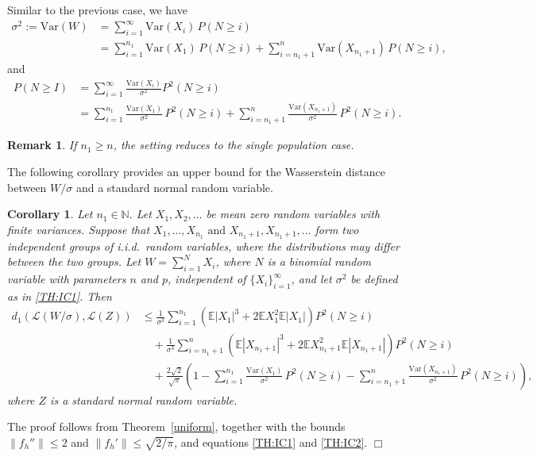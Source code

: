 \documentclass[pdflatex,sn-mathphys-ay]{sn-jnl}
\newcommand{\bbox}{\hfill $\Box$}
\newcommand{\nn}{\nonumber}
\newcommand{\E}{\mathbb{E}}
\newcommand{\Var}{\mathrm{Var}}
\newtheorem{corollary}[theorem]{Corollary}
\newtheorem{remark}[theorem]{Remark}
\theoremstyle{thmstyleone}%
\theoremstyle{thmstyletwo}%
\newtheorem{remark}{Remark}%
\theoremstyle{thmstylethree}%
\begin{document}
        
Similar to the previous case, we have
\begin{align}\label{TH:IC1}
			\sigma^2 := \Var(W) &= \sum_{i=1}^\infty \Var(X_i) \, P(N \ge i)\nn \\
			&=  \sum_{i=1}^{n_{1}  } \Var(X_1)  \, P(N \ge i)+ \sum_{i={n_{1}+1}  }^n \Var(X_{n_{1} + 1})  \, P(N \ge i),
		\end{align}
		and
		\begin{align}\label{TH:IC2}
			{P}(N \ge I) &= \sum_{i=1}^\infty \frac{\Var(X_i)}{\sigma^2}P^2(N \ge i) \nn\\
			&= \sum_{i=1}^{n_1}\frac{\Var(X_1)}{\sigma^2} \, {P}^2(N \ge i) +\sum_{i=n_1+1}^{n}\frac{\Var(X_{n_1+1})}{\sigma^2} \, {P}^2(N \ge i).
		\end{align}
		
	\begin{remark}
If $n_1\ge n$, the setting reduces to the single population case.
	\end{remark}	
		
		The following corollary provides an upper bound for the Wasserstein distance between 
		$W/\sigma$ and a standard normal random variable. 
		
		\begin{corollary}\label{cor:insurance} Let $n_1\in \mathbb{N}.$ Let $X_1,X_2,\ldots$ be mean zero random variables with finite variances.
Suppose that
$X_1,\ldots,X_{n_1} \text{ and }
X_{n_1+1}, X_{n_1+1},\ldots$
form two independent groups of i.i.d.\ random variables, where the distributions may differ
between the two groups. Let $W=\sum_{i=1}^N X_i$, where $N$ is  a binomial random variable  with parameters $n$ and $p$, independent of $\{X_i\}_{i=1}^\infty$, and let $\sigma^2$ be defined as in \eqref{TH:IC1}.  %
   Then
			\begin{align*}
				d_1\left(\mathcal{L}(W/\sigma), \mathcal{L}(Z) \right)
				&\le \frac{1}{\sigma^3}\sum_{i=1}^{n_{1}} \left(\E|X_1|^3 + 2\E X_1^2 \E|X_1|\right) P^2(N \ge i) \\
				&\quad + \frac{1}{\sigma^3} \sum_{i=n_{1}+1}^{n} \left(\E|X_{n_{1}+1}|^3 + 2\E X_{n_{1}+1}^2  \E|X_{n_{1}+1}|\right) P^2(N \ge i) \\
				&\quad + \frac{2\sqrt{2}}{\sqrt{\pi}} \left(1 - \sum_{i=1}^{n_1}\frac{\Var(X_1)}{\sigma^2} \, {P}^2(N \ge i) -\sum_{i=n_1+1}^{n}\frac{\Var(X_{n_1+1})}{\sigma^2} \, {P}^2(N \ge i)\right),
			\end{align*}
			where $Z$ is a standard normal random variable.
		\end{corollary}
		\proof The proof follows from Theorem~\ref{uniform}, together with the bounds
			$\|f_h''\| \le 2$ and $\|f_h'\| \le \sqrt{2/\pi}$, and equations \eqref{TH:IC1} and \eqref{TH:IC2}.
           \bbox
		
\end{document}
